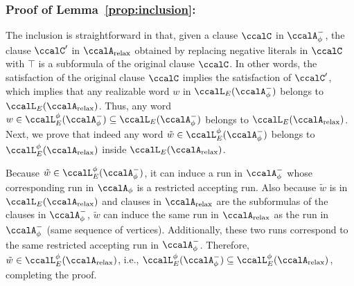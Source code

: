 \documentclass[Afour,sageh,times]{sagej}
\newcommand{\auto}[1]{\ccalA_{\textup{#1}}}
\newcommand{\autop}{\ccalA_{\phi}}
\begin{document}
{{%
\subsubsection{Proof of Lemma~\ref{prop:inclusion}:}\label{app:inclusion}
The inclusion is straightforward in that, given a clause $\ccalC$ in $\autop^-$, the clause $\ccalC'$ in $\auto{relax}$ obtained by replacing negative literals in $\ccalC$ with $\top$ is a subformula of the original clause $\ccalC$. In other words, the satisfaction of the original clause $\ccalC$ implies the satisfaction of $\ccalC'$, which implies that any realizable word $w$ in $\ccalL_E(\autop^-)$ belongs to $\ccalL_E(\auto{relax})$. Thus, any word $w \in \ccalL^\phi_E(\autop^-)  \subseteq  \ccalL_E(\autop^-)$ belongs to $\ccalL_E(\auto{relax})$. Next, we prove that indeed any word $\tilde{w} \in \ccalL^\phi_E(\autop^-)$ belongs to  $\ccalL^\phi_E(\auto{relax})$ inside $ \ccalL_E(\auto{relax})$.

Because $\tilde{w} \in \ccalL^\phi_E(\autop^-)$, it can induce  a run in $\autop^-$ whose corresponding run in $\autop$ is a restricted accepting run. Also because $\tilde{w}$ is in $\ccalL_E(\auto{relax})$ and clauses in $\auto{relax}$ are the subformulas of the clauses in $\autop^-$, $\tilde{w}$ can induce the same run in $\auto{relax}$ as the run in $\autop^-$ (same sequence of vertices). Additionally, these two runs correspond to the same restricted accepting run in $\autop^-$. Therefore, $\tilde{w} \in \ccalL^\phi_E(\auto{relax})$, i.e.,  $\ccalL^\phi_E(\autop^-)\subseteq \ccalL^\phi_E(\auto{relax})$, completing the proof.


}}
\end{document}
